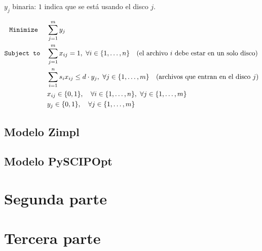 \documentclass[11pt, a4paper, pdftex]{article}
\begin{document}
$y_{j}$ binaria: $1$ indica que se está usando el disco $j$.

\begin{alignat*}{2}
	\texttt{Minimize}\quad\,\,
	& \sum_{j = 1}^{m} y_{j}\\
	\texttt{Subject to}\quad
	& \sum_{j = 1}^{m} x_{ij} = 1, \ \forall i \in \{1, \ldots, n\} \quad\text{(el archivo $i$ debe estar en un solo disco)}\\
	& \sum_{i = 1}^{n} s_{i} x_{ij} \le d\cdot y_{j}, \ \forall j \in \{1, \ldots, m\} \quad\text{(archivos que entran en el disco $j$)}\\
	& x_{ij} \in \{0,1\}, \quad \forall i \in \{1, \ldots, n\}, \ \forall j \in \{1, \ldots, m\}\\
	& y_{j} \in \{0,1\}, \quad \forall j \in \{1, \ldots, m\}
\end{alignat*}

\newpage
\subsection{Modelo Zimpl}



\newpage
\subsection*{Modelo PySCIPOpt}











\section*{Segunda parte}

\section*{Tercera parte}
\end{document}
